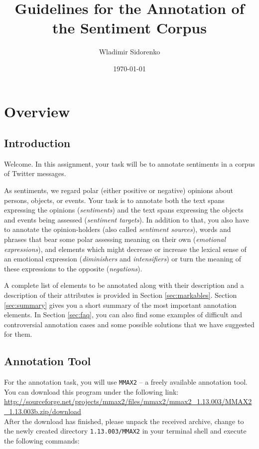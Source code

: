 \documentclass[11pt,a4paper]{article}
\author{Wladimir Sidorenko}
\date{\today}
\title{Guidelines for the Annotation of the Sentiment Corpus}
\begin{document}
\maketitle{}
\section{Overview}
\subsection{Introduction}

Welcome.  In this assignment, your task will be to annotate sentiments
in a corpus of Twitter messages.

As sentiments, we regard polar (either positive or negative) opinions
about persons, objects, or events.  Your task is to annotate both the
text spans expressing the opinions (\textit{sentiments}) and the text
spans expressing the objects and events being assessed
(\textit{sentiment targets}). In addition to that, you also have to
annotate the opinion-holders (also called \textit{sentiment sources}),
words and phrases that bear some polar assessing meaning on their own
(\textit{emotional expressions}), and elements which might decrease or
increase the lexical sense of an emotional expression
(\textit{diminishers} and \textit{intensifiers}) or turn the meaning
of these expressions to the opposite (\textit{negations}).

A complete list of elements to be annotated along with their
description and a description of their attributes is provided in
Section \ref{sec:markables}.  Section \ref{sec:summary} gives you a
short summary of the most important annotation elements. In Section
\ref{sec:faq}, you can also find some examples of difficult and
controversial annotation cases and some possible solutions that we
have suggested for them.

\subsection{Annotation Tool}

For the annotation task, you will use \texttt{MMAX2} -- a freely
available annotation tool.  You can download this program under the
following link:\\\newline
{\setlength{\parindent}{0pt}\small\url{http://sourceforge.net/projects/mmax2/files/mmax2/mmax2_1.13.003/MMAX2_1.13.003b.zip/download}}\\\newline
After the download has finished, please unpack the received archive,
change to the newly created directory \texttt{1.13.003/MMAX2} in your
terminal shell and execute the following commands:\\
\end{document}
